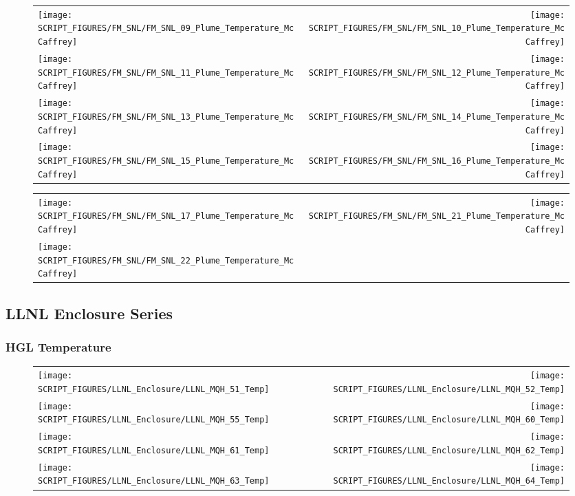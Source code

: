 \begin{figure}[p]
\begin{tabular*}{\textwidth}{l@{\extracolsep{\fill}}r}
\texttt{[image: SCRIPT\_FIGURES/FM\_SNL/FM\_SNL\_09\_Plume\_Temperature\_McCaffrey]} &
\texttt{[image: SCRIPT\_FIGURES/FM\_SNL/FM\_SNL\_10\_Plume\_Temperature\_McCaffrey]} \\
\texttt{[image: SCRIPT\_FIGURES/FM\_SNL/FM\_SNL\_11\_Plume\_Temperature\_McCaffrey]} &
\texttt{[image: SCRIPT\_FIGURES/FM\_SNL/FM\_SNL\_12\_Plume\_Temperature\_McCaffrey]} \\
\texttt{[image: SCRIPT\_FIGURES/FM\_SNL/FM\_SNL\_13\_Plume\_Temperature\_McCaffrey]} &
\texttt{[image: SCRIPT\_FIGURES/FM\_SNL/FM\_SNL\_14\_Plume\_Temperature\_McCaffrey]} \\
\texttt{[image: SCRIPT\_FIGURES/FM\_SNL/FM\_SNL\_15\_Plume\_Temperature\_McCaffrey]} &
\texttt{[image: SCRIPT\_FIGURES/FM\_SNL/FM\_SNL\_16\_Plume\_Temperature\_McCaffrey]}
\end{tabular*}
\end{figure}

\begin{figure}[p]
\begin{tabular*}{\textwidth}{l@{\extracolsep{\fill}}r}
\texttt{[image: SCRIPT\_FIGURES/FM\_SNL/FM\_SNL\_17\_Plume\_Temperature\_McCaffrey]} &
\texttt{[image: SCRIPT\_FIGURES/FM\_SNL/FM\_SNL\_21\_Plume\_Temperature\_McCaffrey]} \\
\texttt{[image: SCRIPT\_FIGURES/FM\_SNL/FM\_SNL\_22\_Plume\_Temperature\_McCaffrey]}
\end{tabular*}
\end{figure}

\clearpage

\subsection{LLNL Enclosure Series}

\subsubsection{HGL Temperature}

\begin{figure}[p]
\begin{tabular*}{\textwidth}{l@{\extracolsep{\fill}}r}
\texttt{[image: SCRIPT\_FIGURES/LLNL\_Enclosure/LLNL\_MQH\_51\_Temp]} &
\texttt{[image: SCRIPT\_FIGURES/LLNL\_Enclosure/LLNL\_MQH\_52\_Temp]} \\
\texttt{[image: SCRIPT\_FIGURES/LLNL\_Enclosure/LLNL\_MQH\_55\_Temp]} &
\texttt{[image: SCRIPT\_FIGURES/LLNL\_Enclosure/LLNL\_MQH\_60\_Temp]} \\
\texttt{[image: SCRIPT\_FIGURES/LLNL\_Enclosure/LLNL\_MQH\_61\_Temp]} &
\texttt{[image: SCRIPT\_FIGURES/LLNL\_Enclosure/LLNL\_MQH\_62\_Temp]} \\
\texttt{[image: SCRIPT\_FIGURES/LLNL\_Enclosure/LLNL\_MQH\_63\_Temp]} &
\texttt{[image: SCRIPT\_FIGURES/LLNL\_Enclosure/LLNL\_MQH\_64\_Temp]}
\end{tabular*}
\end{figure}

